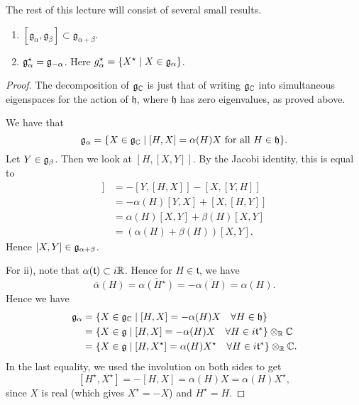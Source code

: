 \documentclass[11pt, english]{article}
\begin{document}
The rest of this lecture will consist of several small results.

\begin{lemma}
\label{lemmadecomp}
  \begin{enumerate}
We have a decomposition $$\g_\C = \mathfrak h \oplus \bigoplus_{\alpha \in \Delta} \g_\alpha.$$ Also:
  \item $[\mathfrak g_\alpha, \mathfrak g_\beta] \subset \mathfrak g_{\alpha+\beta}$.
\item $\mathfrak g_\alpha^\star = \mathfrak g_{-\alpha}$. Here $g_\alpha^\star = \{ X^\star \mid X \in \mathfrak g_\alpha \}$.
  \end{enumerate}
\end{lemma}
\begin{proof}
The decomposition of $\mathfrak g_{\mathbb{C}}$ is just that of writing $\mathfrak g_{\mathbb{C}}$ into simultaneous eigenspaces for the action of $\mathfrak h$, where $\mathfrak h$ has zero eigenvalues, as proved above.

We have that 
$$
\mathfrak g_\alpha = \{ X \in \mathfrak g_{\mathbb{C}} \mid [H,X] = \alpha(H) X \text{ for all } H \in \mathfrak h\}.
$$
Let $Y \in \mathfrak g_\beta$. Then we look at $[H,[X,Y]]$. By the Jacobi identity, this is equal to
\begin{align*}
  [H,[X,Y]] &= -[Y,[H,X]] - [X,[Y,H]] \\
&= -\alpha(H)[Y,X] +[X,[H,Y]] \\
&= \alpha(H)[X,Y] +\beta(H)[X,Y] \\
&= (\alpha(H)+\beta(H))[X,Y].
\end{align*}
Hence $[X,Y] \in \mathfrak g_{\alpha+\beta}$.

For ii), note that $\alpha(\mathfrak t) \subset i \mathbb{R}$. Hence for $H \in \mathfrak t$, we have 
$$
\overline \alpha(H) = \overline{\alpha(H^\star)} = - \overline{\alpha(H)} = \alpha(H).
$$
Hence we have
\begin{align*}
\mathfrak g_\alpha &= \{ X \in \mathfrak g_{\mathbb{C}} \mid [H,X] = -\alpha(H)X \quad \forall H \in \mathfrak h \} \\
&= \{ X \in \mathfrak g \mid [H,X] = -\alpha(H) X \quad \forall H \in i \mathfrak t^\ast \} \otimes_{\mathbb{R}} \mathbb{C}  \\
&= \{ X \in \mathfrak g \mid [H,X^\star] = \alpha(H) X^\star \quad \forall H \in i \mathfrak t ^\ast \} \otimes_{\mathbb{R}} \mathbb{C}.
\end{align*}
In the last equality, we used the involution on both sides to get
$$
[H^\star, X^\star] = -[H,X] = \alpha(H) X = \alpha(H) X^\star,
$$
since $X$ is real (which gives $X^\star = -X$) and $H^\star=H$.
\end{proof}
\end{document}
